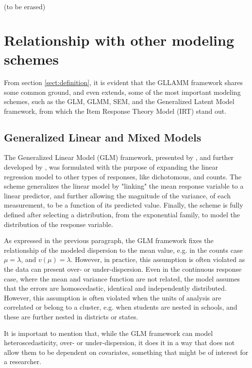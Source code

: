 \newpage
{\color{red}(to be erased) \\


\section{Relationship with other modeling schemes}

From section \ref{sect:definition}, it is evident that the GLLAMM framework shares some common ground, and even extends, some of the most important modeling schemes, such as the GLM, GLMM, SEM, and the Generalized Latent Model framework, from which the Item Response Theory Model (IRT) stand out.

\subsection{Generalized Linear and Mixed Models}

The Generalized Linear Model (GLM) framework, presented by \citet{Nelder_et_al_1972}, and further developed by \citet{Nelder_et_al_1989}, was formulated with the purpose of expanding the linear regression model to other types of responses, like dichotomous, and counts. The scheme generalizes the linear model by "linking" the mean response variable to a linear predictor, and further allowing the magnitude of the variance, of each measurement, to be a function of its predicted value. Finally, the scheme is fully defined after selecting a distribution, from the exponential family, to model the distribution of the response variable.

As expressed in the previous paragraph, the GLM framework fixes the relationship of the modeled dispersion to the mean value, e.g. in the counts case $\mu = \lambda$, and $v(\mu) = \lambda$. However, in practice, this assumption is often violated as the data can present over- or under-dispersion. Even in the continuous response case, where the mean and variance function are not related, the model assumes that the errors are homoscedastic, identical and independently distributed. However, this assumption is often violated when the units of analysis are correlated or belong to a cluster, e.g. when students are nested in schools, and these are further nested in districts or states.

It is important to mention that, while the GLM framework can model heteroscedasticity, over- or under-dispersion, it does it in a way that does not allow them to be dependent on covariates, something that might be of interest for a researcher.

}
